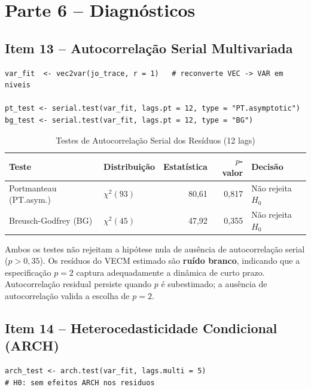 \documentclass[12pt,a4paper]{article}
\begin{document}
\section{Parte 6 -- Diagnósticos}

\subsection{Item 13 -- Autocorrelação Serial Multivariada}

\begin{lstlisting}[caption={Testes de autocorrelação serial aplicados ao VECM (via vec2var)}]
var_fit  <- vec2var(jo_trace, r = 1)   # reconverte VEC -> VAR em niveis

pt_test <- serial.test(var_fit, lags.pt = 12, type = "PT.asymptotic")
bg_test <- serial.test(var_fit, lags.pt = 12, type = "BG")
\end{lstlisting}

\begin{table}[H]
\centering
\caption{Testes de Autocorrelação Serial dos Resíduos (12 lags)}
\label{tab:serial}
\begin{tabular}{llrrl}
\toprule
Teste & Distribuição & Estatística & $p$-valor & Decisão \\
\midrule
Portmanteau (PT.asym.) & $\chi^2(93)$ & 80,61 & 0,817 & Não rejeita $H_0$ \\
Breusch-Godfrey (BG)   & $\chi^2(45)$ & 47,92 & 0,355 & Não rejeita $H_0$ \\
\bottomrule
\end{tabular}
\end{table}

\noindent
Ambos os testes não rejeitam a hipótese nula de ausência de autocorrelação
serial ($p > 0{,}35$).
Os resíduos do VECM estimado são \textbf{ruído branco}, indicando que
a especificação $p = 2$ captura adequadamente a dinâmica de curto prazo.
Autocorrelação residual persiste quando $p$ é subestimado; a ausência
de autocorrelação valida a escolha de $p = 2$.

\subsection{Item 14 -- Heterocedasticidade Condicional (ARCH)}

\begin{lstlisting}[caption={Teste ARCH multivariado (lags = 5)}]
arch_test <- arch.test(var_fit, lags.multi = 5)
# H0: sem efeitos ARCH nos residuos
\end{lstlisting}
\end{document}

